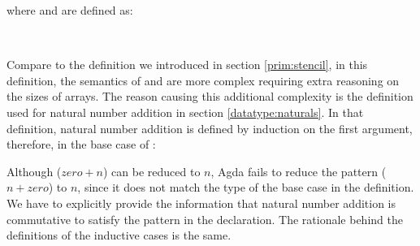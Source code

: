 \documentclass{l4proj}
\begin{document}
where  and  are defined as:
\begin{code}%
\>[0]\AgdaSpace{}%
\AgdaSymbol{:}\AgdaSpace{}%
\AgdaSymbol{\{}\AgdaSpace{}%
\AgdaSpace{}%
\AgdaSymbol{:}\AgdaSpace{}%
\AgdaSymbol{\}}\AgdaSpace{}%
\AgdaSpace{}%
\AgdaSpace{}%
\AgdaOperator{\AgdaPrimitive{+}}\AgdaSpace{}%
\AgdaSpace{}%
\AgdaSpace{}%
\AgdaSpace{}%
\AgdaSpace{}%
\AgdaSymbol{(}\AgdaSpace{}%
\AgdaOperator{\AgdaPrimitive{+}}\AgdaSpace{}%
\AgdaSymbol{)}\<\\%
\>[0]\AgdaSpace{}%
\AgdaSymbol{:}\AgdaSpace{}%
\AgdaSymbol{\{}\AgdaSpace{}%
\AgdaSpace{}%
\AgdaSymbol{:}\AgdaSpace{}%
\AgdaSymbol{\}}\AgdaSpace{}%
\AgdaSpace{}%
\AgdaSpace{}%
\AgdaOperator{\AgdaPrimitive{+}}\AgdaSpace{}%
\AgdaSpace{}%
\AgdaOperator{\AgdaPrimitive{+}}\AgdaSpace{}%
\AgdaSpace{}%
\AgdaSpace{}%
\AgdaSpace{}%
\AgdaOperator{\AgdaPrimitive{+}}\AgdaSpace{}%
\AgdaSpace{}%
\<%
\end{code}
Compare to the definition we introduced in section \ref{prim:stencil}, in this definition, the semantics of  and  are more complex requiring extra reasoning on the sizes of arrays. The reason causing this additional complexity is the definition used for natural number addition in section \ref{datatype:naturals}. In that definition, natural number addition is defined by induction on the first argument, therefore, in the base case of :
\begin{code}
\>[0]\AgdaSpace{}%
\AgdaSymbol{\{}\AgdaSymbol{\}}\AgdaSpace{}%
\AgdaSpace{}%
\AgdaSpace{}%
\AgdaSpace{}%
\AgdaSpace{}%
\AgdaSpace{}%
\AgdaSpace{}%
\AgdaSpace{}%
\AgdaSymbol{=}\AgdaSpace{}%
\<
\end{code}
Although ($zero + n$) can be reduced to $n$, Agda fails to reduce the pattern ($n + zero$) to $n$, since it does not match the type of the base case in the definition. We have to explicitly provide the information that natural number addition is commutative to satisfy the pattern in the declaration. The rationale behind the definitions of the inductive cases is the same.
\end{document}
